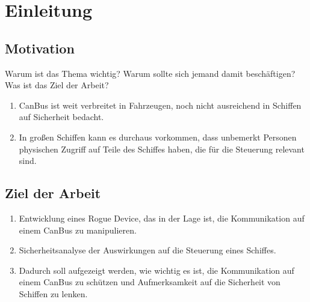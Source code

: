 \chapter{Einleitung}

\section{Motivation}
Warum ist das Thema wichtig? Warum sollte sich jemand damit beschäftigen? Was ist das Ziel der Arbeit?
\begin{enumerate}
    \item CanBus ist weit verbreitet in Fahrzeugen, noch nicht ausreichend in 
    Schiffen auf Sicherheit bedacht.
    \item In großen Schiffen kann es durchaus vorkommen, dass unbemerkt Personen physischen Zugriff auf Teile
    des Schiffes haben, die für die Steuerung relevant sind.
\end{enumerate}

\section{Ziel der Arbeit}
\begin{enumerate}
    \item Entwicklung eines Rogue Device, das in der Lage ist, die Kommunikation auf einem CanBus zu manipulieren.
    \item Sicherheitsanalyse der Auswirkungen auf die Steuerung eines Schiffes.
    \item Dadurch soll aufgezeigt werden, wie wichtig es ist, die Kommunikation auf einem CanBus zu schützen
    und Aufmerksamkeit auf die Sicherheit von Schiffen zu lenken.
\end{enumerate}
